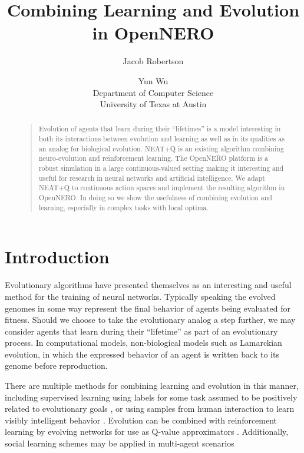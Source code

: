 \documentclass[letterpaper]{article}
\begin{document}
%
\title{Combining Learning and Evolution in OpenNERO}
\author{Jacob Robertson \and Yun Wu\\
Department of Computer Science\\
University of Texas at Austin\\
}
\maketitle
\begin{abstract}
\begin{quote}
Evolution of agents that learn during their ``lifetimes'' is a model interesting in both its interactions between evolution and learning as well as in its qualities as an analog for biological evolution. NEAT+Q is an existing algorithm combining neuro-evolution and reinforcement learning. The OpenNERO platform is a robust simulation in a large continuous-valued setting making it interesting and useful for research in neural networks and artificial intelligence. We adapt NEAT+Q to continuous action spaces and implement the resulting algorithm in OpenNERO. In doing so we show the usefulness of combining evolution and learning, especially in complex tasks with local optima.
\end{quote}
\end{abstract}

\section{Introduction}
Evolutionary algorithms have presented themselves as an interesting and useful method for the training of neural networks. Typically speaking the evolved genomes in some way represent the final behavior of agents being evaluated for fitness. Should we choose to take the evolutionary analog a step further, we may consider agents that learn during their ``lifetime'' as part of an evolutionary process.  In computational models, non-biological models such as Lamarckian evolution, in which the expressed behavior of an agent is written back to its genome before reproduction.

There are multiple methods for combining learning and evolution in this manner, including supervised learning using labels for some task assumed to be positively related to evolutionary goals \cite{nolfi1994learning}, or using samples from human interaction to learn visibly intelligent behavior \cite{bryant2007acquiring}. Evolution can be combined with reinforcement learning by evolving networks for use as Q-value approximators \cite{whiteson2006evolutionary}. Additionally, social learning schemes may be applied in multi-agent scenarios \cite{tansey2012accelerating}
\end{document}
